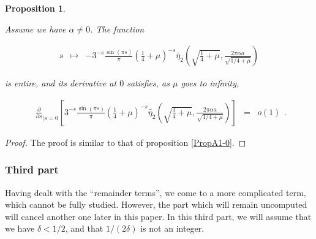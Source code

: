 \documentclass{jams-l}
\newtheorem{proposition}[theorem]{Proposition}
\theoremstyle{definition}
\theoremstyle{remark}
\numberwithin{equation}{section}
\begin{document}
            \begin{proposition}
            \label{PropA2-0}
            
                Assume we have $\alpha \neq 0$. The function
                
                \[ \begin{array}{lll}
                        s & \longmapsto & - 3^{-s} \frac{\sin \left( \pi s \right)}{\pi} \left( \frac{1}{4} + \mu \right)^{-s} \widetilde{\eta_2} \left( \sqrt{\frac{1}{4} + \mu}, \frac{2 \pi \alpha a}{\sqrt{1/4 + \mu}} \right)
                    \end{array} \]
                
                \noindent is entire, and its derivative at $0$ satisfies, as $\mu$ goes to infinity,
                
                \[ \begin{array}{lll}
                        \frac{\partial}{\partial s}_{\left \vert s = 0 \right.} \left[ 3^{-s} \frac{\sin \left( \pi s \right)}{\pi} \left( \frac{1}{4} + \mu \right)^{-s} \widetilde{\eta_2} \left( \sqrt{\frac{1}{4} + \mu}, \frac{2 \pi \alpha a}{\sqrt{1/4 + \mu}} \right) \right] & = & o \left( 1 \right)
                    \end{array} . \]
            
            \end{proposition}
            
            \begin{proof}
            
                The proof is similar to that of proposition \ref{PropA1-0}.
            
            \end{proof}
            
            
        \subsubsection*{\textbf{Third part}}
        \label{AThirdPart}
        
            Having dealt with the ``remainder terms'', we come to a more complicated term, which cannot be fully studied. However, the part which will remain uncomputed will cancel another one later in this paper. In this third part, we will assume that we have $\delta < 1/2$, and that $1 / \left( 2 \delta \right)$ is not an integer.
            
\end{document}
